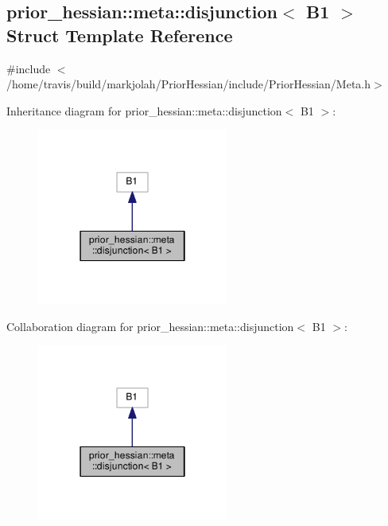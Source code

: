 \hypertarget{structprior__hessian_1_1meta_1_1disjunction_3_01B1_01_4}{}\subsection{prior\+\_\+hessian\+:\+:meta\+:\+:disjunction$<$ B1 $>$ Struct Template Reference}
\label{structprior__hessian_1_1meta_1_1disjunction_3_01B1_01_4}


{\ttfamily \#include $<$/home/travis/build/markjolah/\+Prior\+Hessian/include/\+Prior\+Hessian/\+Meta.\+h$>$}



Inheritance diagram for prior\+\_\+hessian\+:\+:meta\+:\+:disjunction$<$ B1 $>$\+:\nopagebreak
\begin{figure}[H]
\begin{center}
\leavevmode
\includegraphics[width=178pt]{structprior__hessian_1_1meta_1_1disjunction_3_01B1_01_4__inherit__graph}
\end{center}
\end{figure}


Collaboration diagram for prior\+\_\+hessian\+:\+:meta\+:\+:disjunction$<$ B1 $>$\+:\nopagebreak
\begin{figure}[H]
\begin{center}
\leavevmode
\includegraphics[width=178pt]{structprior__hessian_1_1meta_1_1disjunction_3_01B1_01_4__coll__graph}
\end{center}
\end{figure}


